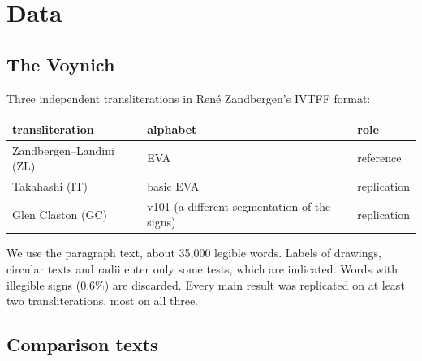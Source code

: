 \section{Data}

\subsection{The Voynich}

Three independent transliterations in René Zandbergen's IVTFF format:

\begin{center}\small
\begin{tabular}{lll}
\toprule
transliteration & alphabet & role \\
\midrule
Zandbergen--Landini (ZL) & EVA & reference \\
Takahashi (IT) & basic EVA & replication \\
Glen Claston (GC) & v101 (a different segmentation of the signs) & replication \\
\bottomrule
\end{tabular}
\end{center}

\noindent We use the paragraph text, about 35{,}000 legible words. Labels of drawings, circular texts and radii enter
only some tests, which are indicated. Words with illegible signs (0.6\%) are discarded. Every main result was replicated
on at least two transliterations, most on all three.

\subsection{Comparison texts}


